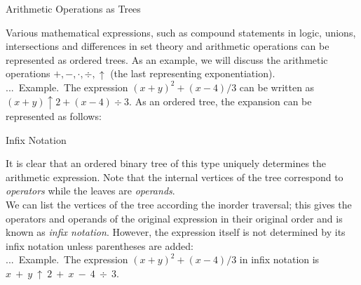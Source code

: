 \documentclass[smaller,hyperref={CJKbookmarks=true}]{beamer}
\newcounter{zhuo}[subsection]
\renewcommand{\thezhuo}{\thesection.\thesubsection.\arabic{zhuo}}
\newenvironment{EXAMPLE}{\stepcounter{zhuo}\alert{\!\thezhuo.~Example.\,}}{}
\begin{document}
\begin{frame}{Arithmetic Operations as Trees}
\begin{spacing}{1}
\vspace*{-6pt}
Various mathematical expressions, such as compound statements in logic,
unions, intersections and differences in set theory and arithmetic operations
can be represented as ordered trees. As an example, we will discuss the
arithmetic operations $+,-,\cdot,\div,\uparrow$ (the last representing exponentiation).\\
\begin{EXAMPLE}
The expression $(x+y)^2+(x-4)/3$ can be written as $(x+y)\uparrow 2+(x-4)\div 3$. As an ordered tree, the expansion can be represented as follows:
\vspace*{-10pt}
\begin{center}
\end{center}
\end{EXAMPLE}
\end{spacing}
\end{frame}
\begin{frame}[c]{Infix Notation}
\begin{spacing}{1.1}
It is clear that an ordered binary tree of this type uniquely determines the
arithmetic expression. Note that the internal vertices of the tree
correspond to \emph{operators} while the leaves are \emph{operands}.\\[7pt]
We can list the vertices of the tree according the inorder traversal; this
gives the operators and operands of the original expression in their original
order and is known as \emph{infix notation}. However, the expression itself is not
determined by its infix notation unless parentheses are added:\\[6pt]
\begin{EXAMPLE}
The expression $(x+y)^2+(x-4)/3$ in infix notation is $x~+~y~\uparrow~2~+~x~-~4~\div~3$.
\end{EXAMPLE}
\end{spacing}
\end{frame}
\end{document}
